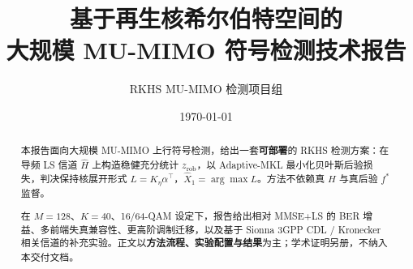 \documentclass[12pt,a4paper,openany]{ctexrep}
\title{\textbf{基于再生核希尔伯特空间的\\大规模 MU-MIMO 符号检测技术报告}}
\author{RKHS MU-MIMO 检测项目组}
\date{\today}
\begin{document}
\maketitle
\begin{abstract}
\noindent
本报告面向大规模 MU-MIMO 上行符号检测，给出一套\textbf{可部署}的 RKHS 检测方案：在导频 LS 信道 $\hat H$ 上构造稳健充分统计 $z_{\mathrm{rob}}$，以 Adaptive-MKL 最小化贝叶斯后验损失，判决保持核展开形式
$L=K_\eta\alpha^\top$，$\hat X_1=\arg\max L$。方法不依赖真 $H$ 与真后验 $f^*$ 监督。

在 $M=128$、$K=40$、16/64-QAM 设定下，报告给出相对 MMSE+LS 的 BER 增益、多前端失真兼容性、更高阶调制迁移，以及基于 Sionna 3GPP CDL / Kronecker 相关信道的补充实验。正文以\textbf{方法流程、实验配置与结果}为主；学术证明另册，不纳入本交付文档。
\end{abstract}

\tableofcontents
\clearpage









\end{document}
